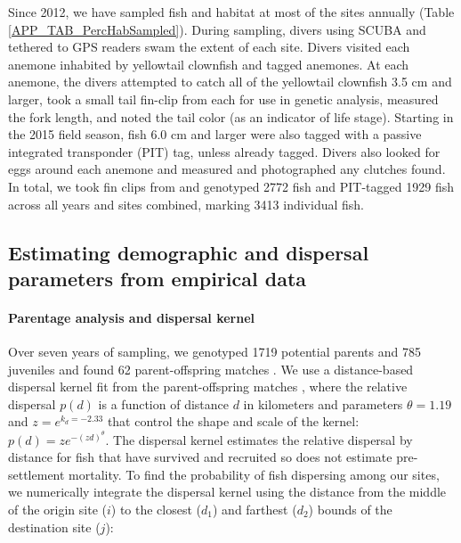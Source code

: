\documentclass[12pt, oneside]{article}   	%
\begin{document}
Since 2012, we have sampled fish and habitat at most of the sites annually (Table \ref{APP_TAB_PercHabSampled}). During sampling, divers using SCUBA and tethered to GPS readers swam the extent of each site. Divers visited each anemone inhabited by yellowtail clownfish and tagged anemones. At each anemone, the divers attempted to catch all of the yellowtail clownfish 3.5 cm and larger, took a small tail fin-clip from each for use in genetic analysis, measured the fork length, and noted the tail color (as an indicator of life stage). Starting in the 2015 field season, fish 6.0 cm and larger were also tagged with a passive integrated transponder (PIT) tag, unless already tagged. Divers also looked for eggs around each anemone and measured and photographed any clutches found. In total, we took fin clips from and genotyped 2772 fish and PIT-tagged 1929 fish across all years and sites combined, marking 3413 individual fish. %

\subsection*{Estimating demographic and dispersal parameters from empirical data} 

\paragraph*{Parentage analysis and dispersal kernel}  %

Over seven years of sampling, we genotyped 1719 potential parents and 785 juveniles and found 62 parent-offspring matches \citep[details in][]{catalanoInPrepconnectivity}.
We use a distance-based dispersal kernel fit from the parent-offspring matches \citep{catalanoInPrepconnectivity}, where the relative dispersal $p(d)$ is a function of distance $d$ in kilometers and parameters $\theta = 1.19$ and $z = e^{k_d = -2.33}$ that control the shape and scale of the kernel: $p(d) = ze^{-(zd)^\theta}$. The dispersal kernel estimates the relative dispersal by distance for fish that have survived and recruited so does not estimate pre-settlement mortality. To find the probability of fish dispersing among our sites, we numerically integrate the dispersal kernel using the distance from the middle of the origin site ($i$) to the closest ($d_1$) and farthest ($d_2$) bounds of the destination site ($j$):
\end{document}
